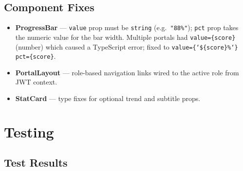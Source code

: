 \documentclass[11pt, a4paper]{article}
\newcommand{\code}[1]{\texttt{\small #1}}
\begin{document}
\subsection{Component Fixes}

\begin{itemize}[leftmargin=1.5em, itemsep=2pt]
  \item \textbf{ProgressBar} --- \code{value} prop must be \code{string}
    (e.g.\ \code{"88\%"}); \code{pct} prop takes the numeric value for the bar
    width. Multiple portals had \code{value=\{score\}} (number) which caused
    a TypeScript error; fixed to \code{value=\{`\$\{score\}\%`\} pct=\{score\}}.

  \item \textbf{PortalLayout} --- role-based navigation links wired to the
    active role from JWT context.

  \item \textbf{StatCard} --- type fixes for optional trend and subtitle props.
\end{itemize}

\section{Testing}

\subsection{Test Results}
\end{document}
